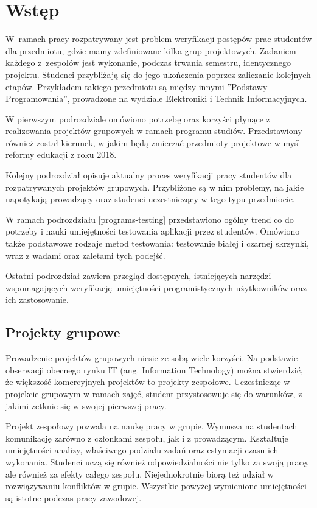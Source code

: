 \chapter{Wstęp}
\label{intro}

W~ramach pracy rozpatrywany jest problem weryfikacji postępów prac studentów dla przedmiotu, gdzie mamy zdefiniowane kilka grup projektowych.
Zadaniem każdego z~zespołów jest wykonanie, podczas trwania semestru, identycznego projektu.
Studenci przybliżają się do jego ukończenia poprzez zaliczanie kolejnych etapów.
Przykładem takiego przedmiotu są między innymi ”Podstawy Programowania”, prowadzone na wydziale Elektroniki i Technik Informacyjnych.

W pierwszym podrozdziale omówiono potrzebę oraz korzyści płynące z realizowania projektów grupowych w ramach programu studiów. 
Przedstawiony również został kierunek, w jakim będą zmierzać przedmioty projektowe w myśl reformy edukacji z roku 2018.

Kolejny podrozdział opisuje aktualny proces weryfikacji pracy studentów dla rozpatrywanych projektów grupowych.
Przybliżone są w nim problemy, na jakie napotykają prowadzący oraz studenci uczestniczący w tego typu przedmiocie.

W ramach podrozdziału \ref{programs-testing} przedstawiono ogólny trend co do potrzeby i nauki umiejętności testowania aplikacji przez studentów.
Omówiono także podstawowe rodzaje metod testowania: testowanie białej i czarnej skrzynki, wraz z wadami oraz zaletami tych podejść.

Ostatni podrozdział zawiera przegląd dostępnych, istniejących narzędzi wspomagających weryfikację umiejętności programistycznych użytkowników oraz ich zastosowanie.

\vfill

\section{Projekty grupowe}

Prowadzenie projektów grupowych niesie ze sobą wiele korzyści.
Na podstawie obserwacji obecnego rynku IT (ang. Information Technology) można stwierdzić, że większość komercyjnych projektów to projekty zespołowe.
Uczestnicząc w projekcie grupowym w ramach zajęć, student przystosowuje się do warunków, z jakimi zetknie się w swojej pierwszej pracy.

Projekt zespołowy pozwala na naukę pracy w grupie.
Wymusza na studentach komunikację zarówno z członkami zespołu, jak i z prowadzącym.
Kształtuje umiejętności analizy, właściwego podziału zadań oraz estymacji czasu ich wykonania.
Studenci uczą się również odpowiedzialności nie tylko za swoją pracę, ale również za efekty całego zespołu.
Niejednokrotnie biorą też udział w rozwiązywaniu konfliktów w grupie.
Wszystkie powyżej wymienione umiejętności są istotne podczas pracy zawodowej.


